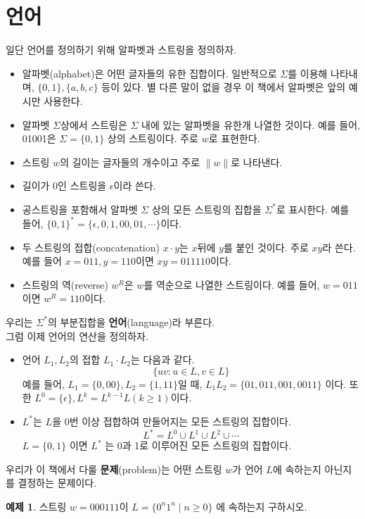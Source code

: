 \documentclass[b5paper]{book}
\theoremstyle{definition}
\newtheorem{ex}{예제}[chapter]
\begin{document}
\section{언어}
일단 언어를 정의하기 위해 알파벳과 스트링을 정의하자.
\begin{itemize}
    \item 알파벳(alphabet)은 어떤 글자들의 유한 집합이다. 일반적으로
    $\Sigma$를 이용해 나타내며, $\{0, 1\}, \{a, b, c\}$ 등이 있다. 별 다른
    말이 없을 경우 이 책에서 알파벳은 앞의 예시만 사용한다. 
    \item 알파벳 $\Sigma$상에서 스트링은 $\Sigma$ 내에 있는 알파벳을 유한개
    나열한 것이다. 예를 들어, 01001은 $\Sigma = \{0, 1\}$ 상의 스트링이다.
    주로 $w$로 표현한다.
    \item 스트링 $w$의 길이는 글자들의 개수이고 주로 $\| w \|$로 나타낸다.
    \item 길이가 0인 스트링을 $\epsilon$이라 쓴다. 
    \item 공스트링을 포함해서 알파벳 $\Sigma$ 상의 모든 스트링의 집합을
    $\Sigma^*$로 표시한다. 예를 들어, $\{0, 1\}^{*} = \{\epsilon, 0, 1, 00, 01 , \cdots \}$이다.
    \item 두 스트링의 접합(concatenation) $x \cdot y$는 $x$뒤에 $y$를 붙인 것이다.
    주로 $xy$라 쓴다. 예를 들어 $x = 011, y = 110$이면 $xy = 011110$이다. 
    \item 스트링의 역(reverse) $w^R$은 $w$를 역순으로 나열한 스트링이다. 
    예를 들어, $w=011$이면
    $w^R=110$이다.
\end{itemize}
우리는 $\Sigma^*$의 부분집합을 \textbf{언어}(language)라 부른다.\\ 
그럼 이제 언어의 연산을 정의하자.
\begin{itemize}
    \item 언어 $L_1, L_2$의 접합 $L_1 \cdot L_2$는 다음과 같다.
    $$\{uv: u \in L, v \in L\}$$
    예를 들어, $L_1 = \{0, 00\}, L_2 = \{1, 11\}$일 때,
    $L_1 L_2 = \{01, 011, 001, 0011\}$ 이다. 또한
    $L^0 = \{ \epsilon\}, L^{k} = L^{k-1} L (k \ge 1)$이다.  
    \item $L^*$는 $L$을 0번 이상 접합하여 만들어지는 모든 스트링의 집합이다.
    $$L^* = L^0 \cup L^1 \cup L^2 \cup \cdots $$
    $L = \{0, 1\}$ 이면 $L^*$ 는 0과 1로 이루어진 모든 스트링의 집합이다.
\end{itemize}
우리가 이 책에서 다룰 \textbf{문제}(problem)는 어떤 스트링 $w$가 언어 $L$에 속하는지
아닌지를 결정하는 문제이다.
\begin{ex}
    스트링 $w = 000111$이 $L = \{0^n 1^n \;\vert\; n \ge 0\}$ 에 속하는지
구하시오.
\end{ex}
\end{document}
